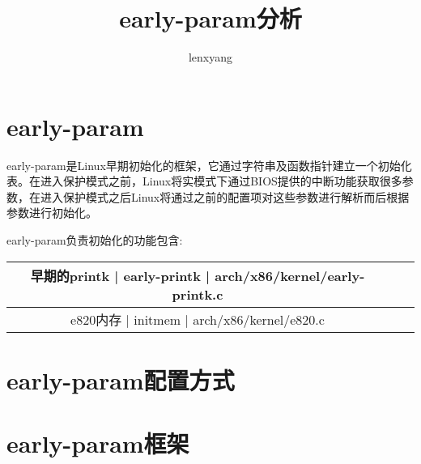 \documentclass[b5paper,9pt,twoside,openany]{article}
\begin{document}
\title{early-param分析}
\author{lenxyang}
\maketitle
\section{early-param}
early-param是Linux早期初始化的框架，它通过字符串及函数指针建立一个初始化表。在进入保护模式之前，Linux将实模式下通过BIOS提供的中断功能获取很多参数，在进入保护模式之后Linux将通过之前的配置项对这些参数进行解析而后根据参数进行初始化。

early-param负责初始化的功能包含:

\begin{tabular}{|c|c|c|}
\hline
早期的printk | early-printk | arch/x86/kernel/early-printk.c \\
\hline
e820内存 | initmem  | arch/x86/kernel/e820.c \\
\end{tabular}
\section{early-param配置方式}

\section{early-param框架}
\end{document}
